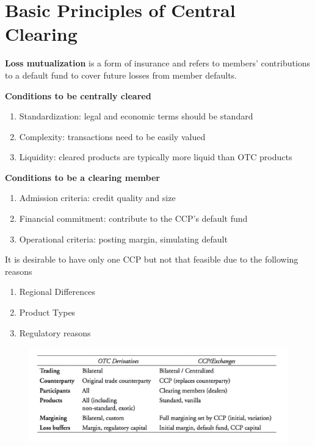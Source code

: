 \documentclass[11pt,fleqn]{book} %
\numberwithin{equation}{section} %
\numberwithin{figure}{section} %
\numberwithin{table}{section} %
\begin{document}
\chapter{Basic Principles of Central Clearing}
 \begin{definition}\textbf{Loss mutualization} is a form of insurance and refers to members' contributions to a default fund to cover future losses from member defaults.
 
 \end{definition}
 \begin{definition}\textbf{Conditions to be centrally cleared}
    \begin{enumerate}
        \item Standardization: legal and economic terms should be standard
        \item Complexity: transactions need to be easily valued
        \item Liquidity: cleared products are typically more liquid than OTC products
    \end{enumerate}
 \end{definition}
 \begin{definition}\textbf{Conditions to be a clearing member}
    \begin{enumerate}
        \item Admission criteria: credit quality and size
        \item Financial commitment: contribute to the CCP's default fund
        \item Operational criteria: posting margin, simulating default
    \end{enumerate}
 \end{definition}
 \begin{remark}It is desirable to have only one CCP but not that feasible due to the following reasons
    \begin{enumerate}
        \item Regional Differences
        \item Product Types
        \item Regulatory reasons
    \end{enumerate}
 \end{remark}
 \begin{figure}[h!]
    \begin{center}
        \includegraphics[scale=0.7]{Central.png}
    \end{center}
 \end{figure}
\end{document}
